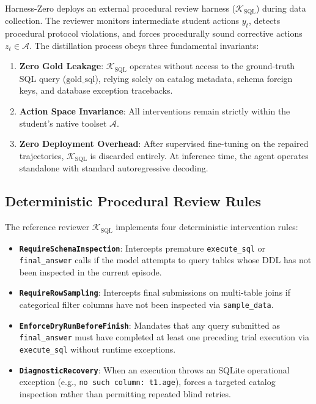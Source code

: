 \documentclass{article}
\theoremstyle{plain}
\theoremstyle{definition}
\theoremstyle{remark}
\begin{document}
Harness-Zero deploys an external procedural review harness ($\mathcal{K}_{\text{SQL}}$) during data collection. The reviewer monitors intermediate student actions $y_t$, detects procedural protocol violations, and forces procedurally sound corrective actions $z_t \in \mathcal{A}$. The distillation process obeys three fundamental invariants:
\begin{enumerate}[leftmargin=*,itemsep=1pt]
    \item \textbf{Zero Gold Leakage}: $\mathcal{K}_{\text{SQL}}$ operates without access to the ground-truth SQL query ($\text{gold\_sql}$), relying solely on catalog metadata, schema foreign keys, and database exception tracebacks.
    \item \textbf{Action Space Invariance}: All interventions remain strictly within the student's native toolset $\mathcal{A}$.
    \item \textbf{Zero Deployment Overhead}: After supervised fine-tuning on the repaired trajectories, $\mathcal{K}_{\text{SQL}}$ is discarded entirely. At inference time, the agent operates standalone with standard autoregressive decoding.
\end{enumerate}

\subsection{Deterministic Procedural Review Rules}
The reference reviewer $\mathcal{K}_{\text{SQL}}$ implements four deterministic intervention rules:
\begin{itemize}[leftmargin=*,itemsep=1pt]
    \item \textbf{\texttt{RequireSchemaInspection}}: Intercepts premature \texttt{execute\_sql} or \texttt{final\_answer} calls if the model attempts to query tables whose DDL has not been inspected in the current episode.
    \item \textbf{\texttt{RequireRowSampling}}: Intercepts final submissions on multi-table joins if categorical filter columns have not been inspected via \texttt{sample\_data}.
    \item \textbf{\texttt{EnforceDryRunBeforeFinish}}: Mandates that any query submitted as \texttt{final\_answer} must have completed at least one preceding trial execution via \texttt{execute\_sql} without runtime exceptions.
    \item \textbf{\texttt{DiagnosticRecovery}}: When an execution throws an SQLite operational exception (e.g., \texttt{no such column: t1.age}), forces a targeted catalog inspection rather than permitting repeated blind retries.
\end{itemize}
\end{document}
